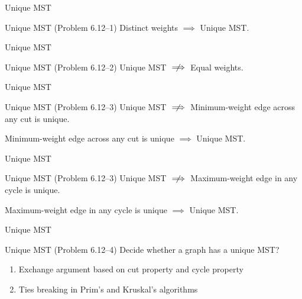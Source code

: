 \begin{frame}{Unique MST}
  \begin{exampleblock}{Unique MST (Problem 6.12--1)}
    Distinct weights $\implies$ Unique MST.
  \end{exampleblock}
\end{frame}
\begin{frame}{Unique MST}
  \begin{exampleblock}{Unique MST (Problem 6.12--2)}
	Unique MST $\centernot\implies$ Equal weights.
  \end{exampleblock}

\end{frame}
\begin{frame}{Unique MST}
  \begin{exampleblock}{Unique MST (Problem 6.12--3)}
	Unique MST $\centernot\implies$ Minimum-weight edge across any cut is unique.
  \end{exampleblock}


  \begin{theorem}
    Minimum-weight edge across any cut is unique $\implies$ Unique MST.
  \end{theorem}
\end{frame}
\begin{frame}{Unique MST}
  \begin{exampleblock}{Unique MST (Problem 6.12--3)}
    Unique MST $\centernot\implies$ Maximum-weight edge in any cycle is unique.
  \end{exampleblock}


  \begin{theorem}[Conjecture]
	Maximum-weight edge in any cycle is unique $\implies$ Unique MST.
  \end{theorem}
\end{frame}
\begin{frame}{Unique MST}
  \begin{exampleblock}{Unique MST (Problem 6.12--4)}
	Decide whether a graph has a unique MST?
  \end{exampleblock}

  \vspace{0.60cm}
  \begin{enumerate}
	\item Exchange argument based on cut property and cycle property
	\item Ties breaking in Prim's and Kruskal's algorithms
  \end{enumerate}
\end{frame}
